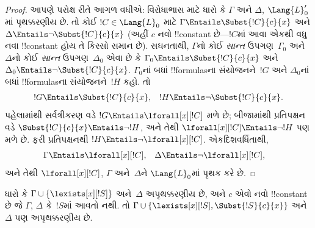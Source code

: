 \documentclass[../../../include/open-logic-section]{subfiles}
\begin{document}
\begin{proof}
આપણે પરોક્ષ રીતે આગળ વધીએ: વિરોધાભાસ માટે ધારો કે $\Gamma$ અને
$\Delta$, $\Lang{L}'_0$માં પૃથક્કરણીય છે. તો કોઈ $!C\in\Lang{L}_0$
માટે $\Gamma \Entails \Subst{!C}{c}{x}$ અને $\Delta \Entails \lnot
\Subst{!C}{c}{x}$ (અહીં $c$ નવો !!{constant} છે---$!C$માં આવા એકથી
વધુ નવા !!{constant} હોય તે કિસ્સો સમાન છે). સઘનતાથી, $\Gamma$નો
કોઈ \emph{સાન્ત} ઉપગણ~$\Gamma_0$ અને $\Delta$નો કોઈ \emph{સાન્ત}
ઉપગણ~$\Delta_0$ એવા છે કે $\Gamma_0 \Entails \Subst{!C}{c}{x}$ અને
$\Delta_0 \Entails \lnot \Subst{!C}{c}{x}$. $\Gamma_0$નાં બધાં
!!{formula}sના સંયોજનને~$!G$ અને $\Delta_0$નાં બધાં !!{formula}sના
સંયોજનને~$!H$ કહો. તો
\begin{align*}
  !G & \Entails \Subst{!C}{c}{x}, & !H  \Entails \lnot \Subst{!C}{c}{x}.
\end{align*}
પહેલામાંથી સર્વત્રીકરણ વડે $!G \Entails \lforall[x][!C]$ મળે છે;
બીજામાંથી પ્રતિપક્ષન વડે $\Subst{!C}{c}{x} \Entails \lnot !H$, અને
તેથી $\lforall[x][!C] \Entails \lnot !H$ પણ મળે છે. ફરી પ્રતિપક્ષનથી
$!H \Entails \lnot \lforall[x][!C]$. એકદિશવર્ધિતાથી,
\begin{align*}
  \Gamma &\Entails \lforall[x][!C], &
  \Delta & \Entails \lnot \lforall[x][!C],
\end{align*}
અને તેથી $\lforall[x][!C]$, $\Gamma$ અને~$\Delta$ને $\Lang{L}_0$માં
પૃથક કરે છે.
\end{proof}

\begin{lem}
ધારો કે $\Gamma \cup \{ \lexists[x][!S] \}$ અને~$\Delta$
અપૃથક્કરણીય છે, અને $c$ એવો નવો !!{constant} છે જે $\Gamma$,
$\Delta$ કે~$!S$માં આવતો નથી. તો $\Gamma \cup \{ \lexists[x][!S],
\Subst{!S}{c}{x} \}$ અને~$\Delta$ પણ અપૃથક્કરણીય છે.
\end{lem}
\end{document}
